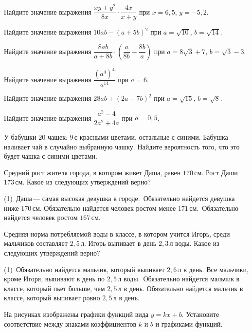 %
%

\begin{class}[number=1]
	\begin{listofex}
		\item Найдите значение выражения  \( \dfrac{xy+y^{2}}{8x}\cdot\dfrac{4x}{x+y} \)  при \( x = 6,5 \), \( y = -5,2 \).
		\item Найдите значение выражения  \( 10ab-(a+5b)^{2} \)  при \( a = \sqrt{10} \), \( b = \sqrt{14} \).
		\item Найдите значение выражения  \( \dfrac{8ab}{a+8b}\cdot\left( \dfrac{a}{8b}-\dfrac{8b}{a} \right) \)  при \( a = 8\sqrt{3}+7 \), \( b = \sqrt{3}-3 \).
		\item Найдите значение выражения  \( \dfrac{(a^{4})^{4}}{a^{14}} \)  при \( a = 6 \).
		\item Найдите значение выражения  \( 28ab+(2a-7b)^{2} \)  при \( a = \sqrt{15} \), \( b = \sqrt{8} \).
		\item Найдите значение выражения  \( \dfrac{a^{2}-4}{2a^{2}+4a} \)  при \( a = 0,5 \).
		\item У бабушки \( 20 \) чашек: \( 9 \) с красными цветами, остальные с синими. Бабушка наливает чай в случайно выбранную чашку. Найдите вероятность того, что это будет чашка с синими цветами.
		\item Средний рост жителя города, в котором живет Даша, равен \( 170 \) см. Рост Даши \( 173 \) см. Какое из следующих утверждений верно?
		\begin{tasks}(1)
			\task  Даша --- самая высокая девушка в городе.
			\task  Обязательно найдется девушка ниже \( 170 \) см.
			\task Обязательно найдется человек ростом менее \( 171 \) см.
			\task  Обязательно найдется человек ростом \( 167 \) см.
		\end{tasks}
		\item Средняя норма потребляемой воды в классе, в котором учится Игорь, среди мальчиков составляет \( 2,5 \) л. Игорь выпивает в день \( 2,3 \) л воды. Какое из следующих утверждений верно?
		\begin{tasks}(1)
			\task  Обязательно найдется мальчик, который выпивает \( 2,6 \) л в день.
			\task Все мальчики, кроме Игоря, выпивают в день по \( 2,5 \) л воды.
			\task  Обязательно найдется мальчик в классе, который пьет больше, чем \( 2,5 \) л в день.
			\task Обязательно найдется мальчик в классе, который выпивает ровно \( 2,5 \) л в день.
		\end{tasks}
	\newpage
		\item На рисунках изображены графики функций вида \( y=kx + b \). Установите соответствие между знаками коэффициентов \( k \) и \( b \) и графиками функций.
		

\end{listofex}
\end{class}
